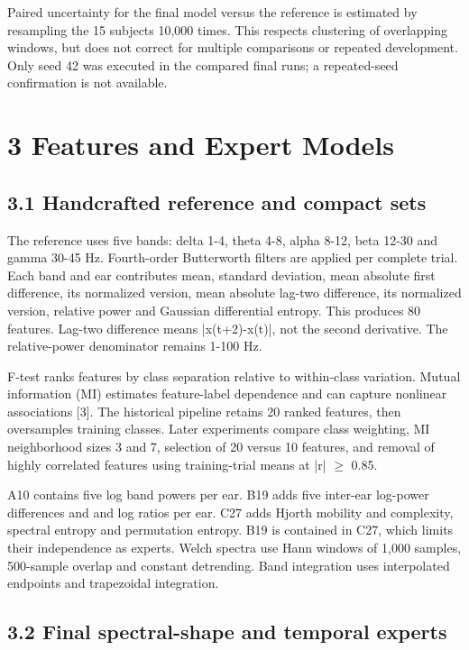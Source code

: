 \documentclass[10pt,a4paper]{article}
\begin{document}
Paired uncertainty for the final model versus the reference is estimated by resampling the 15 subjects 10,000 times. This respects clustering of overlapping windows, but does not correct for multiple comparisons or repeated development. Only seed 42 was executed in the compared final runs; a repeated-seed confirmation is not available.


\section*{3 Features and Expert Models}

\subsection*{3.1 Handcrafted reference and compact sets}

The reference uses five bands: delta 1-4, theta 4-8, alpha 8-12, beta 12-30 and gamma 30-45 Hz. Fourth-order  Butterworth filters are applied per complete trial. Each band and ear contributes mean, standard deviation, mean absolute first difference, its normalized version, mean absolute lag-two difference, its normalized version, relative power and Gaussian differential entropy. This produces 80 features. Lag-two difference means |x(t+2)-x(t)|, not the second derivative. The relative-power denominator remains 1-100 Hz.


F-test ranks features by class separation relative to within-class variation. Mutual information (MI) estimates feature-label dependence and can capture nonlinear associations [3]. The historical pipeline retains 20 ranked features, then oversamples training classes. Later experiments compare class weighting, MI neighborhood sizes 3 and 7, selection of 20 versus 10 features, and removal of highly correlated features using training-trial means at |r| $\geq$ 0.85.


A10 contains five log band powers per ear. B19 adds five inter-ear log-power differences and  and  log ratios per ear. C27 adds Hjorth mobility and complexity, spectral entropy and permutation entropy. B19 is contained in C27, which limits their independence as experts. Welch spectra use Hann windows of 1,000 samples, 500-sample overlap and constant detrending. Band integration uses interpolated endpoints and trapezoidal integration.


\subsection*{3.2 Final spectral-shape and temporal experts}
\end{document}
